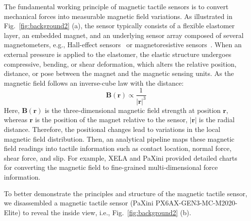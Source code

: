 The fundamental working principle of magnetic tactile sensors is to convert mechanical forces 
into measurable magnetic field variations. 
As illustrated in Fig.~\ref{fig:background2} (a), the sensor typically consists of a flexible elastomer layer, an embedded magnet, and an underlying sensor array composed of several magnetometers, e.g., Hall-effect sensors~\cite{tomo2016hall} or magnetoresistive sensors~\cite{oh2017magnetic}. 
When an external pressure is applied to the elastomer, the elastic structure undergoes compressive, bending, or shear deformation, which alters the relative position, distance, or pose between the magnet and the magnetic sensing units.
As the magnetic field follows an inverse-cube law with the distance:
\begin{equation}
    \mathbf{B(r)}\propto\frac{1}{\mathbf{|r|}^3}
    \label{eq:proportion}
\end{equation}
Here, $\mathbf{B(r)}$ is the three-dimensional magnetic field strength at position $\mathbf{r}$, whereas $\mathbf{r}$ is the position of the magnet relative to the sensor,
$|\mathbf{r}|$ is the radial distance.
Therefore, the positional changes lead to variations in the local magnetic field distribution. 
Then, an analytical pipeline maps these magnetic field readings into tactile information such as contact location, normal force, shear force, and slip. 
For example, XELA and PaXini provided detailed charts~\cite{xela2026technology,paxini2026itpu} for converting the magnetic field to fine-grained multi-dimensional force information.

To better demonstrate the principles and structure of the magnetic tactile sensor, we disassembled a magnetic tactile sensor (PaXini PX6AX-GEN3-MC-M2020-Elite) to reveal the inside view, i.e., Fig.~\ref{fig:background2} (b).

